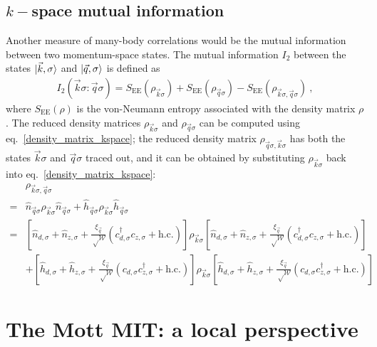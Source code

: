 \documentclass[prb]{revtex4-2}
\begin{document}
\subsection{\(k-\)space mutual information}
Another measure of many-body correlations would be the mutual information between two momentum-space states. The mutual information \(I_2\) between the states \(\ket{\vec k, \sigma}\) and \(\ket{\vec q, \sigma}\) is defined as
\begin{equation}\begin{aligned}
	I_2(\vec k\sigma:\vec q\sigma) = S_\text{EE}(\rho_{\vec k\sigma}) + S_\text{EE}(\rho_{\vec q\sigma}) - S_\text{EE}(\rho_{\vec k\sigma, \vec q\sigma})~,
\end{aligned}\end{equation}
where \(S_\text{EE}(\rho)\) is the von-Neumann entropy associated with the density matrix \(\rho\). The reduced density matrices \(\rho_{\vec k\sigma}\) and \(\rho_{\vec q\sigma}\) can be computed using eq.~\ref{density_matrix_kspace}; the reduced density matrix \(\rho_{\vec q\sigma, \vec k\sigma}\) has both the states \(\vec k\sigma\) and \(\vec q\sigma\) traced out, and it can be obtained by substituting \(\rho_{\vec k\sigma}\) back into eq.~\ref{density_matrix_kspace}:
\begin{equation}\begin{aligned}
	&\rho_{\vec k\sigma, \vec q\sigma} \\
	=& \hat n_{\vec q\sigma}\rho_{\vec k\sigma}\hat n_{\vec q\sigma} + \hat h_{\vec q\sigma}\rho_{\vec k\sigma}\hat h_{\vec q\sigma}\\
	=& \left[\hat n_{d,\sigma} + \hat n_{z,\sigma} + \frac{\xi_{\vec q}}{\sqrt \mathcal{W}}\left(c^\dagger_{d,\sigma}c_{z,\sigma} + \text{h.c.} \right)\right] \rho_{\vec k\sigma} \left[\hat n_{d,\sigma} + \hat n_{z,\sigma} + \frac{\xi_{\vec q}}{\sqrt \mathcal{W}}\left(c^\dagger_{d,\sigma}c_{z,\sigma} + \text{h.c.} \right)\right]\\
				  &+ \left[\hat h_{d,\sigma} + \hat h_{z,\sigma} + \frac{\xi_{\vec q}}{\sqrt \mathcal{W}}\left(c_{d,\sigma}c^\dagger_{z,\sigma} + \text{h.c.} \right)\right] \rho_{\vec k\sigma} \left[\hat h_{d,\sigma} + \hat h_{z,\sigma} + \frac{\xi_{\vec q}}{\sqrt \mathcal{W}}\left(c_{d,\sigma}c^\dagger_{z,\sigma} + \text{h.c.} \right)\right]
\end{aligned}\end{equation}


\section{The Mott MIT: a local perspective}
\end{document}
